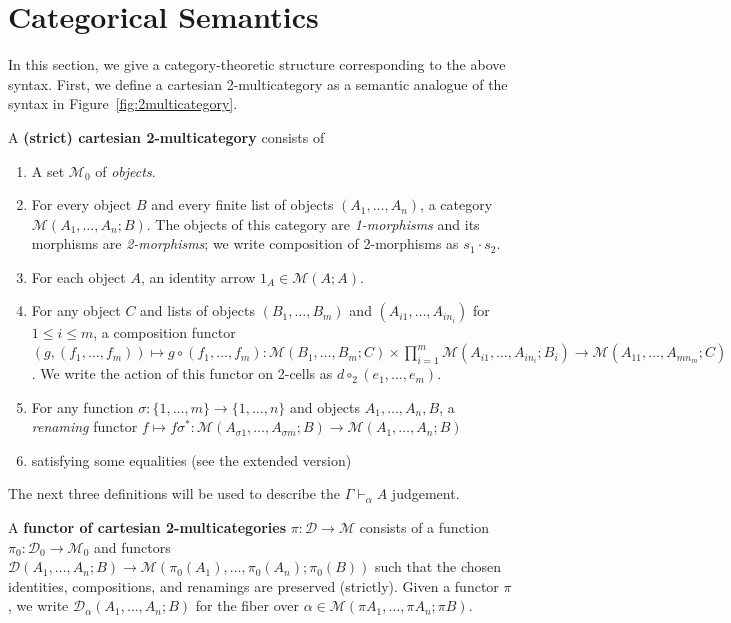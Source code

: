 \documentclass[a4paper,USenglish,numberwithinsect]{lipics-v2016}
\newcommand\seq[3]{\ensuremath{#1 \vdash_{#2} #3}}
\newcommand\Fsymb[0]{\dsd{F}}
\newcommand\Usymb[0]{\dsd{U}}
\def\M{\mathcal{M}}
\newcommand\compv[2]{\ensuremath{#1 \cdot #2}}
\newcommand\comph[2]{\ensuremath{#1 \mathbin{\circ_2} #2}}
\begin{document}

\newcommand\cD{\ensuremath{\mathcal{D}}}
\newcommand\IndF[3]{\ensuremath{{#1}^\Fsymb_{{#2},{#3}}}}
\newcommand\IndU[4]{\ensuremath{{#1}^\Usymb_{{#2},{#3},{#4}}}}

\section{Categorical Semantics}
\label{sec:semantics}

In this section, we give a category-theoretic structure corresponding to
the above syntax.  First, we define a cartesian 2-multicategory as a
semantic analogue of the syntax in Figure~\ref{fig:2multicategory}. 

\begin{definition}
  A \textbf{(strict) cartesian 2-multicategory} consists of
  \begin{enumerate}
  \item A set $\M_0$ of \emph{objects}.
  \item For every object $B$ and every finite list of objects $(A_1,\dots,A_n)$, a category $\M(A_1,\dots,A_n;B)$.
    The objects of this category are \emph{1-morphisms} and its morphisms are \emph{2-morphisms}; we write composition of 2-morphisms as $\compv{s_1}{s_2}$.
  \item For each object $A$, an identity arrow $1_A\in\M(A;A)$.
  \item For any object $C$ and lists of objects $(B_1,\dots,B_m)$ and
    $(A_{i1},\dots,A_{in_i})$ for $1\le i\le m$, a composition functor
    $(g,(f_1,\dots,f_m)) \mapsto g\circ (f_1,\dots,f_m) : 
    \M(B_1,\dots,B_m;C) \times \prod_{i=1}^m \M(A_{i1},\dots,A_{in_i};B_i) \longrightarrow \M(A_{11},\dots,A_{mn_m};C)$.
    We write the action of this functor on 2-cells as $\comph{d}{(e_1,\dots,e_m)}$.
  \item For any function $\sigma : \{1,\dots,m\} \to \{1,\dots,n\}$ and
    objects $A_1,\dots,A_n,B$, a \emph{renaming} functor $f \mapsto
    f\sigma^* : \M(A_{\sigma 1},\dots,A_{\sigma m}; B) \to \M(A_1,\dots,A_n;B)$
  \item satisfying some equalities (see the extended version)
  \end{enumerate}
\end{definition}

The next three definitions will be used to describe the
\seq{\Gamma}{\alpha}{A} judgement.  

\begin{definition}
  A \textbf{functor of cartesian 2-multicategories} $\pi:\cD\to\M$
  consists of a function $\pi_0 : \cD_0 \to \M_0$ and functors
  $\cD(A_1,\ldots,A_n;B) \to \M(\pi_0(A_1),\ldots,\pi_0(A_n);\pi_0(B))$ such
  that the chosen identities, compositions, and renamings are preserved
  (strictly).  Given a functor $\pi$, we write
  $\cD_\alpha(A_1,\dots,A_n;B)$ for the fiber over 
  $\alpha \in \M(\pi A_1,\dots,\pi A_n;\pi B)$.
\end{definition}
\end{document}
